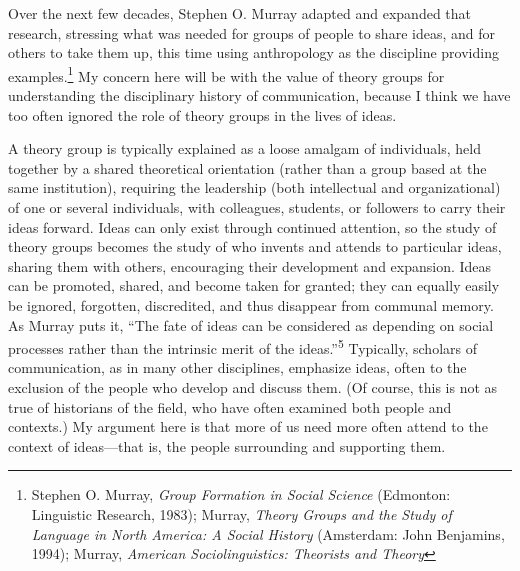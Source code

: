 \documentclass{tufte-handout}
\begin{document}
Over the next few decades, Stephen O. Murray adapted and expanded that
research, stressing what was needed for groups of people to share ideas,
and for others to take them up, this time using anthropology as the
discipline providing examples.\setcounter{footnote}{3}\footnote{Stephen O. Murray, \emph{Group Formation in Social Science} (Edmonton:
  Linguistic Research, 1983); Murray, \emph{Theory Groups and the Study
  of Language in North America: A Social History} (Amsterdam: John
  Benjamins, 1994); Murray, \emph{American Sociolinguistics: Theorists
  and Theory}
} My
concern here will be with the value of theory groups for understanding
the disciplinary history of communication, because I think we have too
often ignored the role of theory groups in the lives of ideas.

A theory group is typically explained as a loose amalgam of individuals,
held together by a shared theoretical orientation (rather than a group
based at the same institution), requiring the leadership (both
intellectual and organizational) of one or several individuals, with
colleagues, students, or followers to carry their ideas forward. Ideas
can only exist through continued attention, so the study of theory
groups becomes the study of who invents and attends to particular ideas,
sharing them with others, encouraging their development and expansion.
Ideas can be promoted, shared, and become taken for granted; they can
equally easily be ignored, forgotten, discredited, and thus disappear
from communal memory. As Murray puts it, ``The fate of ideas can be
considered as depending on social processes rather than the intrinsic
merit of the ideas.''\textsuperscript{5} Typically,
scholars of communication, as in many other disciplines, emphasize
ideas, often to the exclusion of the people who develop and discuss
them. (Of course, this is not as true of historians of the field, who
have often examined both people and contexts.) My argument here is that
more of us need more often attend to the context of ideas---that is, the
people surrounding and supporting them.
\end{document}
